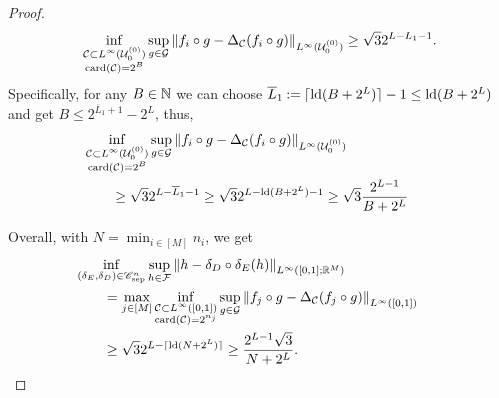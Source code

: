 \documentclass[10pt,a4paper]{amsart}
\newcommand{\defeq}{\mathbin{:=}}
\newcommand{\set}[1]{\ensuremath{\mathcal{#1}}}
\begin{document}
\begin{proof}
\begin{align}
    \inf_{\substack{\set{C}\subset L^\infty(\dyadicU{0}{0})\\\card{\set{C}}=2^B}}\sup_{g\in\RadHaarSpace}\norm{f_i\circ g-\Delta_{\set{C}}(f_i\circ g)}[{L^\infty(\dyadicU{0}{0})}]\geq \sqrt{3}2^{L-L_1-1}.
\end{align}
Specifically, for any $B\in\nn$ we can choose $\overline{L}_1\defeq\lceil\ld(B+2^{L})\rceil-1\leq \ld(B+2^{L})$ and get $B\leq 2^{\overline{L}_1+1}-2^{L}$, thus,
\begin{align}
    &\kern-2em\inf_{\substack{\set{C}\subset L^\infty(\dyadicU{0}{0})\\\card{\set{C}}=2^B}}\sup_{g\in\RadHaarSpace}\norm{f_i\circ g-\Delta_{\set{C}}(f_i\circ g)}[{L^\infty(\dyadicU{0}{0})}]
    \\&
    \geq
    \sqrt{3}
    2^{L-\overline{L}_1-1}
    \geq
    \sqrt{3}2^{L-\ld(B+2^{L})-1}
    \geq
    \sqrt{3}\frac{2^{L-1}}{B+2^{L}}
\end{align}

Overall, with $N=\min_{i\in[M]}n_i$, 
we get
\begin{align}
    &\kern-2em\inf_{(\encoder,\decoder)\in\sepClass[n]}
    \sup_{h\in\set{F}}
    \norm{h-\decoder\circ\encoder(h)}[{L^\infty([0,1];\rr[M])}]
    \\&
    =
    \max_{j\in[M]}\inf_{\substack{\set{C}\subset L^\infty([0,1])\\\card{\set{C}}=2^{n_j}}}\sup_{g\in\RadHaarSpace}\norm{f_j\circ g-\Delta_{\set{C}}(f_j\circ g)}[{L^\infty([0,1])}]
    \\&
    \geq
    \sqrt{3}2^{L-\lceil\ld(N+2^{L})\rceil}
    \geq 
    \frac{2^{L-1}\sqrt{3}}{N+2^{L}}.
\end{align}
\end{proof}
\end{document}

